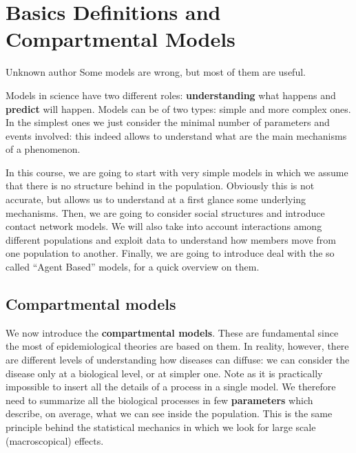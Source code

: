 \documentclass[../main/main.tex]{subfiles}
\begin{document}
\chapter{Basics Definitions and Compartmental Models}

\begin{chapquote}{Unknown author}
Some models are wrong, but most of them are useful.
\end{chapquote}



Models in science have two different roles: \textbf{understanding} what happens and \textbf{predict} will happen.
Models can be of two types: simple and more complex ones. In the simplest ones we just consider the minimal number of parameters and events involved: this indeed allows to understand what are the main mechanisms of a phenomenon.

In this course, we are going to start with very simple models in which we assume that there is no structure behind in the population. Obviously this is not accurate, but allows us to understand at a first glance some underlying mechanisms.
Then, we are going to consider social structures and introduce contact network models. We will also take into account interactions among different populations and exploit data to understand how members move from one population to another. Finally, we are going to introduce deal with the so called “Agent Based” models, for a quick overview on them.

\section{Compartmental models}

We now introduce the \textbf{compartmental models}. These are fundamental since the most of epidemiological theories are based on them. In reality, however, there are different levels of understanding how diseases can diffuse: we can consider the disease only at a biological level, or at simpler one. Note as it is practically impossible to insert all the details of a process in a single model. We therefore need to summarize all the biological processes in few \textbf{parameters} which describe, on average, what we can see inside the population. This is the same principle behind the statistical mechanics in which we look for large scale (macroscopical) effects.
\end{document}
